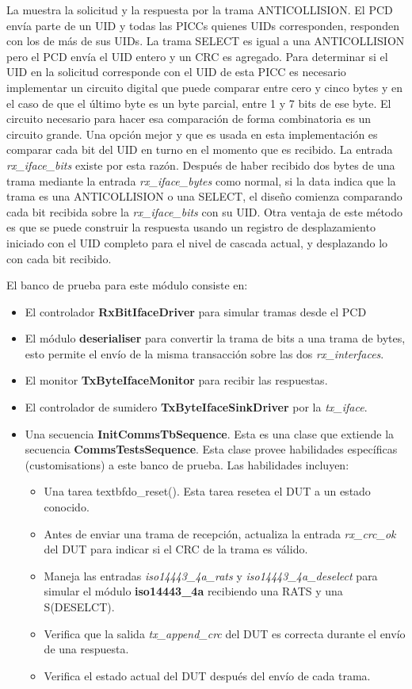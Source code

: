 \documentclass[a4paper, twoside, 11pt]{report}
\begin{document}
La  muestra la solicitud y la respuesta por la trama ANTICOLLISION. El PCD envía parte de un UID y todas las PICCs quienes UIDs corresponden, responden con los de más de sus UIDs. La trama SELECT es igual a una ANTICOLLISION pero el PCD envía el UID entero y un CRC es agregado. Para determinar si el UID en la solicitud corresponde con el UID de esta PICC es necesario implementar un circuito digital que puede comparar entre cero y cinco bytes y en el caso de que el último byte es un byte parcial, entre 1 y 7 bits de ese byte. El circuito necesario para hacer esa comparación de forma combinatoria es un circuito grande. Una opción mejor y que es usada en esta implementación es comparar cada bit del UID en turno en el momento que es recibido. La entrada \textit{rx\_iface\_bits} existe por esta razón. Después de haber recibido dos bytes de una trama mediante la entrada \textit{rx\_iface\_bytes} como normal, si la data indica que la trama es una ANTICOLLISION o una SELECT, el diseño comienza comparando cada bit recibida sobre la \textit{rx\_iface\_bits} con su UID. Otra ventaja de este método es que se puede construir la respuesta usando un registro de desplazamiento iniciado con el UID completo para el nivel de cascada actual, y desplazando lo con cada bit recibido.

El banco de prueba para este módulo consiste en: 

\begin{itemize}
  \item El controlador \textbf{RxBitIfaceDriver} para simular tramas desde el PCD
  \item El módulo \textbf{deserialiser} para convertir la trama de bits a una trama de bytes, esto permite el envío de la misma transacción sobre las dos \textit{rx\_interfaces}.
  \item El monitor \textbf{TxByteIfaceMonitor} para recibir las respuestas.
  \item El controlador de sumidero \textbf{TxByteIfaceSinkDriver} por la \textit{tx\_iface}.
  \item Una secuencia \textbf{InitCommsTbSequence}. Esta es una clase que extiende la secuencia \textbf{CommsTestsSequence}. Esta clase provee habilidades específicas (customisations) a este banco de prueba. Las habilidades incluyen:
  \begin{itemize}[label=$\circ$]
    \item Una tarea textbf{do\_reset()}. Esta tarea resetea el DUT a un estado conocido.
    \item Antes de enviar una trama de recepción, actualiza la entrada \textit{rx\_crc\_ok} del DUT para indicar si el CRC de la trama es válido.
    \item Maneja las entradas \textit{iso14443\_4a\_rats} y \textit{iso14443\_4a\_deselect} para simular el módulo \textbf{iso14443\_4a} recibiendo una RATS y una S(DESELCT).
    \item Verifica que la salida \textit{tx\_append\_crc} del DUT es correcta durante el envío de una respuesta.
    \item Verifica el estado actual del DUT después del envío de cada trama.
  \end{itemize}
\end{itemize}
\end{document}
